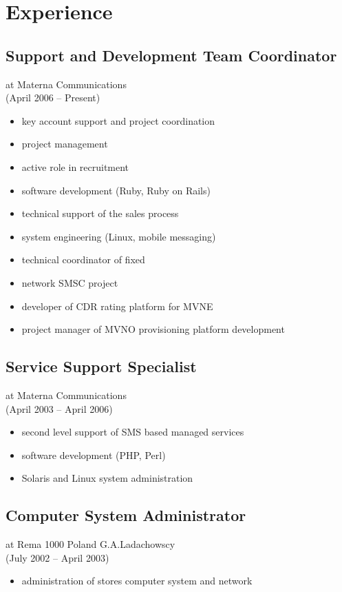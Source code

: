 \documentclass[9pt,a4paper,twocolumn]{extarticle}
\begin{document}
\section*{Experience}

\subsection*{Support and Development Team Coordinator}
at Materna Communications\\
(April 2006 – Present)
\begin{itemize}
\setlength{\itemsep}{0cm}%
\setlength{\parskip}{0cm}%
\item key account support and project coordination
\item project management
\item active role in recruitment
\item software development (Ruby, Ruby on Rails)
\item technical support of the sales process
\item system engineering (Linux, mobile messaging)
\item technical coordinator of ﬁxed 
\item network SMSC project
\item developer of CDR rating platform for MVNE
\item project manager of MVNO provisioning platform development 
\end{itemize}

\subsection*{Service Support Specialist}
at Materna Communications \\
(April 2003 – April 2006) 
\begin{itemize}
\setlength{\itemsep}{0cm}%
\setlength{\parskip}{0cm}%
\item second level support of SMS based managed services
\item software development (PHP, Perl)
\item Solaris and Linux system administration
\end{itemize}

\subsection*{Computer System Administrator }
at Rema 1000 Poland G.A.Ladachowscy \\
(July 2002 – April 2003) 
\begin{itemize}
\setlength{\itemsep}{0cm}%
\setlength{\parskip}{0cm}%
\item administration of stores computer system and network
\end{itemize}
\end{document}
